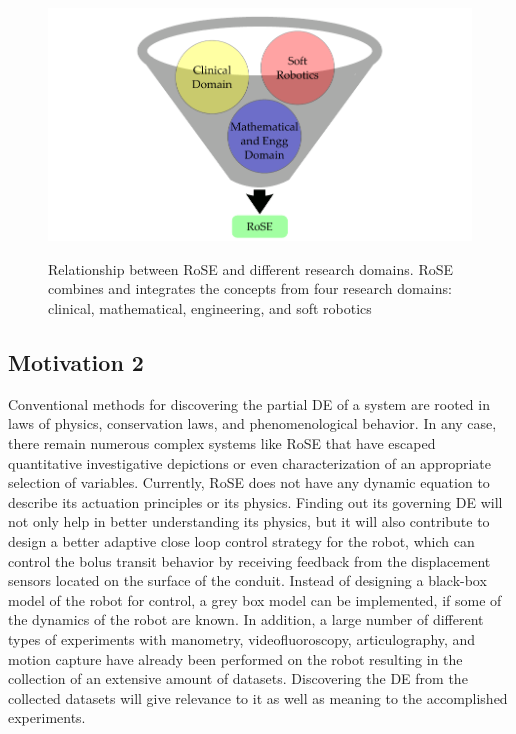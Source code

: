 \begin{figure}[bth]
	\myfloatalign
	{\includegraphics[width=\linewidth]{images/Ch1/fig2_funnel}} \quad
	\caption[Relationship between RoSE and different research domains.]{Relationship between RoSE and different research domains. \ac{RoSE} combines and integrates the concepts from four research domains: clinical, mathematical, engineering, and soft robotics}\label{fig2_funnel}
\end{figure}

\subsection{Motivation 2}

Conventional methods for discovering the partial \ac{DE}
of a system are rooted in laws of physics, conservation laws,
and phenomenological behavior. In any case, there remain numerous
complex systems like \ac{RoSE} that have escaped quantitative investigative
depictions or even characterization of an appropriate selection of
variables.
Currently, \ac{RoSE} does not have any dynamic equation to describe its
actuation principles or its physics. Finding out its governing \ac{DE} will not only help in better understanding its physics,
but it will also contribute to design a better adaptive close loop control
strategy for the robot, which can control the bolus transit behavior
by receiving feedback from the displacement sensors located on the
surface of the conduit. Instead of designing a black-box model of the
robot for control, a grey box model can be implemented, if some of
the dynamics of the robot are known.
In addition, a large number of different types of experiments with
manometry, videofluoroscopy, articulography, and motion capture
have already been performed on the robot resulting in the collection of
an extensive amount of datasets. Discovering the \ac{DE} from the collected datasets will give relevance to it as well as
meaning to the accomplished experiments.

